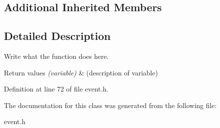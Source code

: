 \subsection*{Additional Inherited Members}


\subsection{Detailed Description}
Write what the function does here. 


\begin{DoxyRetVals}{Return values}
{\em (variable)} & (description of variable) \\
\hline
\end{DoxyRetVals}


Definition at line 72 of file event.\+h.



The documentation for this class was generated from the following file\+:\begin{DoxyCompactItemize}
\item 
event.\+h\end{DoxyCompactItemize}
